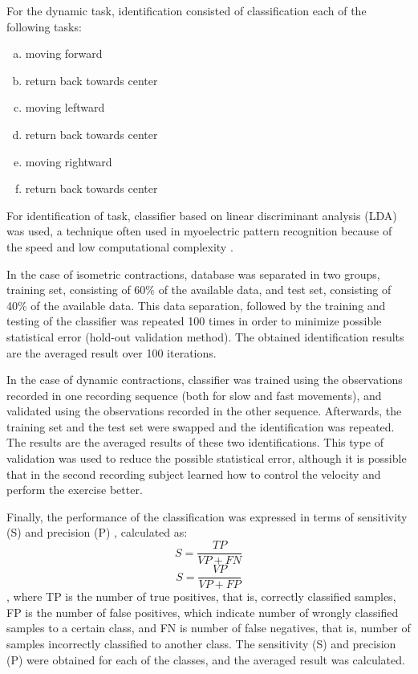 For the dynamic task, identification consisted of classification each of the following tasks:
 
\begin{enumerate}[a)]
\item moving forward
\item return back towards center
\item moving leftward
\item return back towards center
\item moving rightward
\item return back towards center
\end{enumerate}

For identification of task, classifier based on linear discriminant analysis (LDA) was used, a technique often used in myoelectric pattern recognition because of the speed and low computational complexity \citep{Zhou2007}.

In the case of isometric contractions, database was separated in two groups, training set, consisting of 60\% of the available data, and test set, consisting of 40\% of the available data. This data separation, followed by the training and testing of the classifier was repeated 100 times in order to minimize possible statistical error (hold-out validation method). The obtained identification results are the averaged result over 100 iterations.

In the case of dynamic contractions, classifier was trained using the observations recorded in one recording sequence (both for slow and fast movements), and validated using the observations recorded in the other sequence. Afterwards, the training set and the test set were swapped and the identification was repeated. The results are the averaged results of these two identifications. This type of validation was used to reduce the possible statistical error, although it is possible that in the second recording subject learned how to control the velocity and perform the exercise better.

Finally, the performance of the classification was expressed in terms of sensitivity (S) and precision (P) \citep{Farina2001}, calculated as:
\begin{equation}
S = \frac{TP}{VP+FN}
\end{equation}
\begin{equation}
S = \frac{VP}{VP+FP}
\end{equation}
, where TP is the number of true positives, that is, correctly classified samples, FP is the number of false positives, which indicate number of wrongly classified samples to a certain class, and FN is number of false negatives, that is, number of samples incorrectly classified to another class. The sensitivity (S) and precision (P) were obtained for each of the classes, and the averaged result was calculated.



